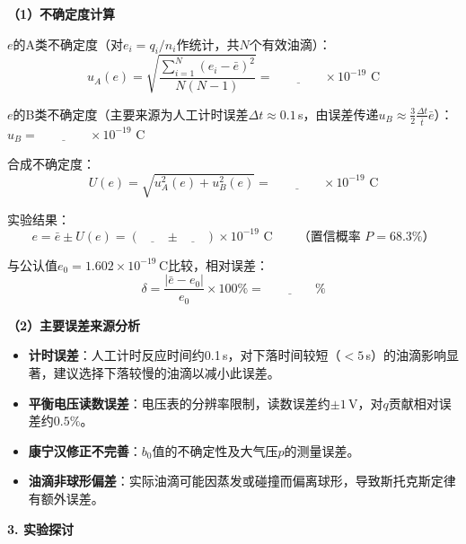 \documentclass[a4paper,12pt]{article}
\begin{document}
{\fontsize{12pt}{18pt}\selectfont

\textbf{（1）不确定度计算}

$e$的A类不确定度（对$e_i = q_i/n_i$作统计，共$N$个有效油滴）：
\begin{equation}
    u_A(e) = \sqrt{\frac{\sum_{i=1}^{N}\left(e_i - \bar{e}\right)^2}{N(N-1)}} = \underline{\qquad\qquad} \times 10^{-19} \text{ C}
\end{equation}

$e$的B类不确定度（主要来源为人工计时误差$\Delta t \approx 0.1$\,s，由误差传递$u_B \approx \frac{3}{2}\frac{\Delta t}{\bar{t}}\bar{e}$）：$u_B = \underline{\qquad\qquad} \times 10^{-19}$ C

合成不确定度：
\begin{equation}
    U(e) = \sqrt{u_A^2(e) + u_B^2(e)} = \underline{\qquad\qquad} \times 10^{-19} \text{ C}
\end{equation}

实验结果：
\begin{equation}
    e = \bar{e} \pm U(e) = \left(\underline{\qquad} \pm \underline{\qquad}\right) \times 10^{-19} \text{ C} \qquad \text{（置信概率 $P = 68.3\%$）}
\end{equation}

与公认值$e_0 = 1.602\times10^{-19}$\,C比较，相对误差：
\begin{equation}
    \delta = \frac{|\bar{e} - e_0|}{e_0} \times 100\% = \underline{\qquad\qquad}\%
\end{equation}

\textbf{（2）主要误差来源分析}

\begin{itemize}[nosep, leftmargin=2em]
    \item \textbf{计时误差}：人工计时反应时间约0.1\,s，对下落时间较短（$<5$\,s）的油滴影响显著，建议选择下落较慢的油滴以减小此误差。
    \item \textbf{平衡电压读数误差}：电压表的分辨率限制，读数误差约$\pm 1$\,V，对$q$贡献相对误差约$0.5\%$。
    \item \textbf{康宁汉修正不完善}：$b_0$值的不确定性及大气压$p$的测量误差。
    \item \textbf{油滴非球形偏差}：实际油滴可能因蒸发或碰撞而偏离球形，导致斯托克斯定律有额外误差。
\end{itemize}

}

\vspace{0.5cm}

{\fontsize{14pt}{20pt}\selectfont \textbf{3. 实验探讨}}
\end{document}

